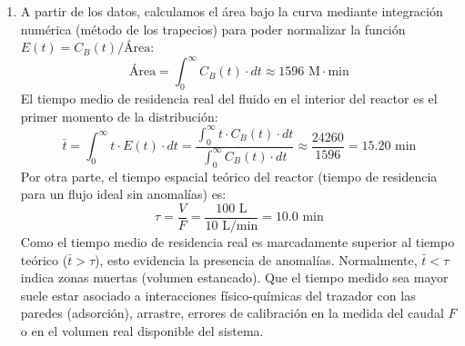 \begin{enumerate}[label=\alph*)]
	\item A partir de los datos, calculamos el área bajo la curva mediante integración numérica (método de los trapecios) para poder normalizar la función $E(t) = C_B(t) / \text{Área}$:
	      \begin{equation*}
		      \text{Área} = \int_0^\infty C_B(t) \cdot dt \approx 1596 \text{ M}\cdot\text{min}
	      \end{equation*}
	      El tiempo medio de residencia real del fluido en el interior del reactor es el primer momento de la distribución:
	      \begin{equation*}
		      \bar{t} = \int_0^\infty t \cdot E(t) \cdot dt = \frac{\int_0^\infty t \cdot C_B(t) \cdot dt}{\int_0^\infty C_B(t) \cdot dt} \approx \frac{24260}{1596} = 15.20 \text{ min}
	      \end{equation*}
	      Por otra parte, el tiempo espacial teórico del reactor (tiempo de residencia para un flujo ideal sin anomalías) es:
	      \begin{equation*}
		      \tau = \frac{V}{F} = \frac{100\text{ L}}{10\text{ L/min}} = 10.0 \text{ min}
	      \end{equation*}
	      Como el tiempo medio de residencia real es marcadamente superior al tiempo teórico ($\bar{t} > \tau$), esto evidencia la presencia de anomalías. Normalmente, $\bar{t} < \tau$ indica zonas muertas (volumen estancado). Que el tiempo medido sea mayor suele estar asociado a interacciones físico-químicas del trazador con las paredes (adsorción), arrastre, errores de calibración en la medida del caudal $F$ o en el volumen real disponible del sistema.


\end{enumerate}
